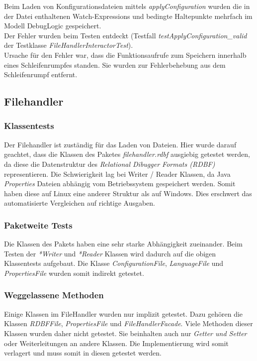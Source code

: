 \documentclass[parskip=full]{scrartcl}
\begin{document}
Beim Laden von Konfigurationsdateien mittels \textit{applyConfiguration} wurden die in der Datei enthaltenen Watch-Expressions und bedingte Haltepunkte mehrfach im Modell DebugLogic gespeichert.\\
Der Fehler wurden beim Testen entdeckt (Testfall \textit{testApplyConfiguration\_valid} der Testklasse \textit{FileHandlerInteractorTest}).\\
Ursache für den Fehler war, dass die Funktionsaufrufe zum Speichern innerhalb eines Schleifenrumpfes standen. 
Sie wurden zur Fehlerbehebung aus dem Schleifenrumpf entfernt.

\subsection{Filehandler}
\subsubsection{Klassentests}
Der Filehandler ist zuständig für das Laden von Dateien. Hier wurde darauf geachtet, dass die Klassen des Paketes \textit{filehandler.rdbf} ausgiebig getestet werden, da diese die Datenstruktur des \textit{Relational Dibugger Formats (RDBF)} representieren.
Die Schwierigkeit lag bei Writer / Reader Klassen, da Java \textit{Properties} Dateien abhängig vom Betriebssystem gespeichert werden. Somit haben diese auf Linux eine anderer Struktur als auf Windows. Dies erschwert das automatisierte Vergleichen auf richtige Ausgaben.

\subsubsection{Paketweite Tests}
Die Klassen des Pakets haben eine sehr starke Abhängigkeit zueinander. Beim Testen der \textit{*Writer} und \textit{*Reader} Klassen wird dadurch auf die obigen Klassentests aufgebaut. Die Klasse \textit{ConfigurationFile}, \textit{LanguageFile} und \textit{PropertiesFile} wurden somit indirekt getestet.

\subsubsection{Weggelassene Methoden}
Einige Klassen im FileHandler wurden nur implizit getestet. Dazu gehören die Klassen \textit{RDBFFile}, \textit{PropertiesFile} und \textit{FileHandlerFacade}.
Viele Methoden dieser Klassen wurden daher nicht getestet. Sie beinhalten auch nur \textit{Getter und Setter} oder Weiterleitungen an andere Klassen. Die Implementierung wird somit verlagert und muss somit in diesen getestet werden.
\end{document}
